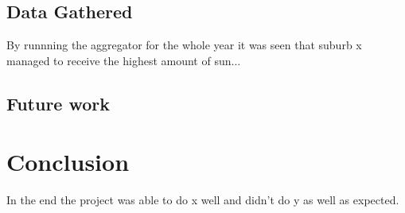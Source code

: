 \documentclass[12pt]{report}
\begin{document}
\section{Data Gathered}
By runnning the aggregator for the whole year it was seen that suburb x managed to receive the highest amount of sun...
\section{Future work}
\chapter{Conclusion}
In the end the project was able to do x well and didn't do y as well as expected.


\end{document}
